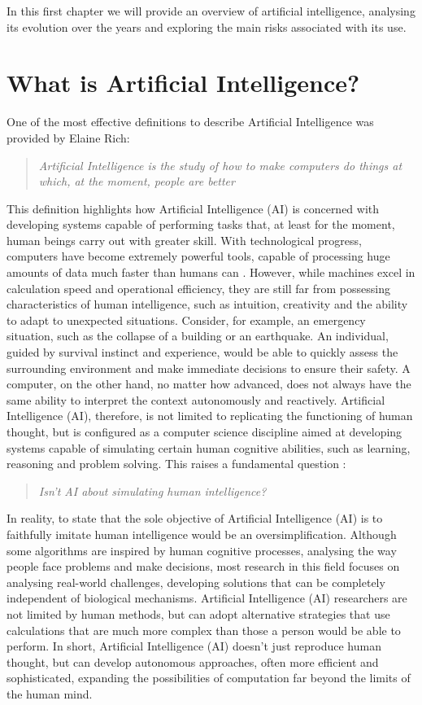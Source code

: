 
In this first chapter we will provide an overview of artificial intelligence, analysing its evolution over the years and  exploring the main risks associated with its use.

\section{What is Artificial Intelligence?}
One of the most effective definitions to describe Artificial Intelligence was provided by Elaine Rich\cite{RADA1986119}:
\begin{quote}
    \textit{Artificial Intelligence is the study of how to make computers do things at which, at the moment, people are better}
\end{quote}
This definition highlights how Artificial Intelligence (AI) is concerned with developing systems capable of performing tasks that, at least for the moment, human beings carry out with greater skill. With technological progress, computers have become extremely powerful tools, capable of processing huge amounts of data much faster than humans can \cite{introductionAI}.
However, while machines excel in calculation speed and operational efficiency, they are still far from possessing characteristics of human intelligence, such as intuition, creativity and the ability to adapt to unexpected situations.
Consider, for example, an emergency situation, such as the collapse of a building or an earthquake. An individual, guided by survival instinct and experience, would be able to quickly assess the surrounding environment and make immediate decisions to ensure their safety. A computer, on the other hand, no matter how advanced, does not always have the same ability to interpret the context autonomously and reactively.
Artificial Intelligence (AI), therefore, is not limited to replicating the functioning of human thought, but is configured as a computer science discipline aimed at developing systems capable of simulating certain human cognitive abilities, such as learning, reasoning and problem solving. This raises a fundamental question \cite{McCarthy2007}:  
\begin{quote}
    \textit{Isn't AI about simulating human intelligence?}
\end{quote}
In reality, to state that the sole objective of Artificial Intelligence (AI) is to faithfully imitate human intelligence would be an oversimplification. Although some algorithms are inspired by human cognitive processes, analysing the way people face problems and make decisions, most research in this field focuses on analysing real-world challenges, developing solutions that can be completely independent of biological mechanisms. Artificial Intelligence (AI) researchers are not limited by human methods, but can adopt alternative strategies that use calculations that are much more complex than those a person would be able to perform.
In short, Artificial Intelligence (AI) doesn't just reproduce human thought, but can develop autonomous approaches, often more efficient and sophisticated, expanding the possibilities of computation far beyond the limits of the human mind.
